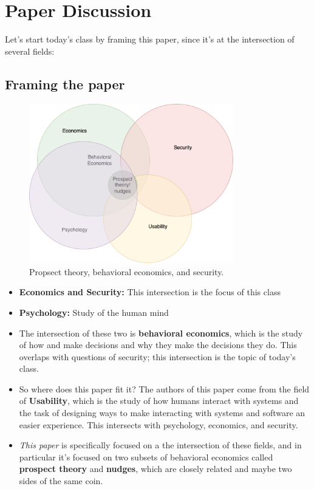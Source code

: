 \documentclass[11pt]{article}
\begin{document}
\section{Paper Discussion}

Let's start today's class by framing this paper, since it's at the intersection of several fields:

\FloatBarrier
\subsection{Framing the paper}

\begin{figure}[h]
    \centering
    \includegraphics*[width=3.5in]{venn.png}
    \caption{Propsect theory, behavioral economics, and security.}
    \label{fig:venn}
\end{figure}
\FloatBarrier


\begin{itemize}
    \item {\bf Economics and Security:} This intersection is the focus of this class
    \item {\bf Psychology:} Study of the human mind 
    \item The intersection of these two is {\bf behavioral economics}, which is the study of how and make decisions and why they make the decisions they do. This overlaps with questions of security; this intersection is the topic of today's class.
    \item So where does this paper fit it? The authors of this paper come from the field of {\bf Usability}, which is the study of how humans interact with systems and the task of designing ways to make interacting with systems and software an easier experience. This intersects with psychology, economics, and security.
    \item {\it This paper} is specifically focused on a the intersection of these fields, and in particular it's focused on two subsets of behavioral economics called {\bf prospect theory} and {\bf nudges}, which are closely related and maybe two sides of the same coin. 
\end{itemize}
\end{document}
